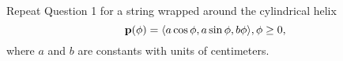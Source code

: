 \documentclass{ximera}
\begin{document}
\begin{question}  \label{Qgtu5uhgfdg}
Repeat Question 1 for a string wrapped around the cylindrical helix
\[
   {\bf p}(\phi) = \langle a \cos \phi, a \sin \phi, b \phi  \rangle , \phi \geq 0 ,
\]
where $a$ and $b$ are constants with units of centimeters.

 
\begin{onlineOnly}
    \begin{center}
\end{center}
\end{onlineOnly}

\end{question}
\end{document}
